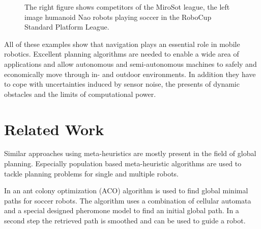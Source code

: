 \begin{description}
\begin{figure}[thpb]
	  \myfloatalign
      \footnotesize
      \centering
   \caption[Soccer robots]{The right figure shows competitors of the MiroSot league, the left image humanoid Nao robots playing soccer in the RoboCup Standard Platform League.}
   \label{fig:fig_competition}
\end{figure}
\end{description}

All of these examples show that navigation plays an essential role in mobile robotics. Excellent planning algorithms are needed to enable a wide area of applications and allow autonomous and semi-autonomous machines to safely and economically move through in- and outdoor environments.
In addition they have to cope with uncertainties induced by sensor noise, the presents of dynamic obstacles and the limits of computational power.

\section{Related Work}\label{sec:relwork}
Similar approaches using meta-heuristics are mostly present in the field of global planning. Especially population based meta-heuristic algorithms are used to tackle planning problems for single and multiple robots.

In \cite{zhou2010improvedantcolony} an ant colony optimization (ACO) algorithm is used to find global minimal paths for soccer robots. 
The algorithm uses a combination of cellular automata and a special designed pheromone model to find an initial global path. 
In a second step the retrieved path is smoothed and can be used to guide a robot.

